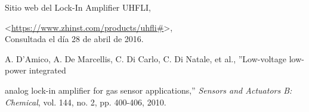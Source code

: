 	\begingroup
	\renewcommand{\section}[2]{}%
	\begin{thebibliography}{100}
	

	
		Sitio web del Lock-In Amplifier UHFLI,
		\vspace{-0.2cm}
		\begin{addmargin}[1em]{0pt}
			<\url{https://www.zhinst.com/products/uhfli#}>, \\ Consultada el día 28 de abril de 2016.		
		\end{addmargin}
		
		 A. D'Amico, A. De Marcellis, C. Di Carlo, C. Di Natale, et al., ''Low-voltage low-power integrated
		\vspace{-0.2cm}
		\begin{addmargin}[1em]{0pt}
			analog lock-in amplifier for gas sensor applications,'' \textit{Sensors and Actuators B: Chemical}, vol. 144, no. 2, pp. 400-406, 2010.	
		\end{addmargin}		
		
	\end{thebibliography}
	\endgroup